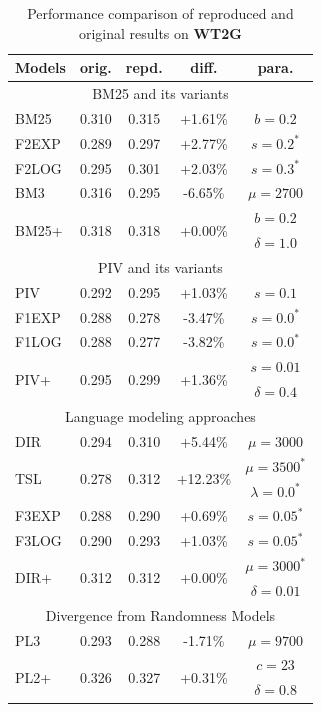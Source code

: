 \begin{table}[t]
\centering
\cprotect\caption{Performance comparison of reproduced and original results on \textbf{WT2G} \label{tab:r1}}
\begin{tabular}{ |l|c|c|c|c| } \hline
\textbf{Models} & \textbf{orig.} & \textbf{repd.} & \textbf{diff.} & \textbf{para.} \\ \hline \hline
\multicolumn{5}{|c|}{BM25 and its variants} \\ \hline 
BM25 & 0.310 & 0.315 & +1.61\% & $b=0.2$ \\ \hline
F2EXP & 0.289 & 0.297 & +2.77\% & $s=0.2^*$ \\ \hline
F2LOG & 0.295 & 0.301 & +2.03\% & $s=0.3^*$ \\ \hline
BM3 & 0.316 & 0.295 & -6.65\% & $\mu=2700$ \\ \hline
\multirow{2}{*}{BM25+} & \multirow{2}{*}{0.318} & \multirow{2}{*}{0.318} & \multirow{2}{*}{+0.00\%} & $b=0.2$ \\
& & & & $\delta=1.0$ \\ \hline \hline 
\multicolumn{5}{|c|}{PIV and its variants} \\ \hline 
PIV & 0.292 & 0.295 & +1.03\% & $s=0.1$ \\ \hline
F1EXP & 0.288 & 0.278 & -3.47\% & $s=0.0^*$ \\ \hline
F1LOG & 0.288 & 0.277 & -3.82\% & $s=0.0^*$ \\ \hline
\multirow{2}{*}{PIV+} & \multirow{2}{*}{0.295} & \multirow{2}{*}{0.299} & \multirow{2}{*}{+1.36\%} & $s=0.01$ \\
& & & & $\delta=0.4$ \\ \hline \hline 
\multicolumn{5}{|c|}{Language modeling approaches} \\ \hline 
DIR & 0.294 & 0.310 & +5.44\% & $\mu=3000$ \\ \hline
\multirow{2}{*}{TSL} & \multirow{2}{*}{0.278} & \multirow{2}{*}{0.312} & \multirow{2}{*}{+12.23\%} & $\mu=3500^*$ \\
& & & & $\lambda=0.0^*$ \\ \hline
F3EXP & 0.288 & 0.290 & +0.69\% & $s=0.05^*$ \\ \hline
F3LOG & 0.290 & 0.293 & +1.03\% & $s=0.05^*$ \\ \hline
\multirow{2}{*}{DIR+} & \multirow{2}{*}{0.312} & \multirow{2}{*}{0.312} & \multirow{2}{*}{+0.00\%} & $\mu=3000^*$ \\
& & & & $\delta=0.01$ \\ \hline \hline 
\multicolumn{5}{|c|}{Divergence from Randomness Models} \\ \hline 
PL3 & 0.293 & 0.288 & -1.71\% & $\mu=9700$ \\ \hline
\multirow{2}{*}{PL2+} & \multirow{2}{*}{0.326} & \multirow{2}{*}{0.327} & \multirow{2}{*}{+0.31\%} & $c=23$ \\
& & & & $\delta=0.8$ \\ \hline
\end{tabular}

\end{table}

